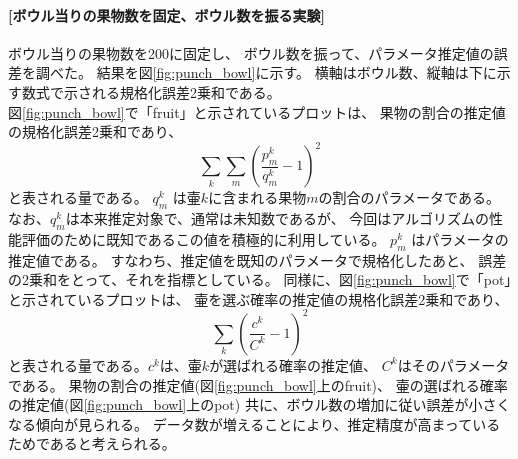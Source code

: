 \documentclass[a4j]{jarticle}
\begin{document}
\paragraph{[ボウル当りの果物数を固定、ボウル数を振る実験]}
ボウル当りの果物数を200に固定し、
ボウル数を振って、パラメータ推定値の誤差を調べた。
結果を図\ref{fig:punch_bowl}に示す。
横軸はボウル数、縦軸は下に示す数式で示される規格化誤差2乗和である。 \\
図\ref{fig:punch_bowl}で「fruit」と示されているプロットは、
果物の割合の推定値の規格化誤差2乗和であり、
\begin{equation}
\label{err_fruit}
\sum_{k} \sum_{m} (\frac{p_m^k}{q_m^k} - 1)^2
\end{equation}
と表される量である。
$q_m^k$ は壷$k$に含まれる果物$m$の割合のパラメータである。
なお、$q_m^k$は本来推定対象で、通常は未知数であるが、
今回はアルゴリズムの性能評価のために既知であるこの値を積極的に利用している。
$p_m^k$ はパラメータの推定値である。
すなわち、推定値を既知のパラメータで規格化したあと、
誤差の2乗和をとって、それを指標としている。
同様に、図\ref{fig:punch_bowl}で「pot」と示されているプロットは、
壷を選ぶ確率の推定値の規格化誤差2乗和であり、
\begin{equation}
\label{err_pot}
\sum_{k} (\frac{c^k}{C^k} - 1)^2
\end{equation}
と表される量である。$c^k$は、壷$k$が選ばれる確率の推定値、
$C^k$はそのパラメータである。
果物の割合の推定値(図\ref{fig:punch_bowl}上のfruit)、
壷の選ばれる確率の推定値(図\ref{fig:punch_bowl}上のpot)
共に、ボウル数の増加に従い誤差が小さくなる傾向が見られる。
データ数が増えることにより、推定精度が高まっているためであると考えられる。
\end{document}

